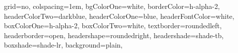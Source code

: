 \documentclass[portrait,final,a0paper]{baposter}
\begin{document}
\newlength{\leftimgwidth}
\begin{poster}%
  {
  grid=no,
  colspacing=1em,
  bgColorOne=white,  %
  borderColor=h-alpha-2,		%
  headerColorTwo=darkblue,	%
  headerColorOne=blue,
  headerFontColor=white,
  boxColorOne=h-alpha-2,
  boxColorTwo=white,
  textborder=roundedleft,  %
  headerborder=open,%
  headershape=roundedright,
  headershade=shade-tb, %
  boxshade=shade-lr,
  background=plain,
}
\end{poster}
\end{document}
